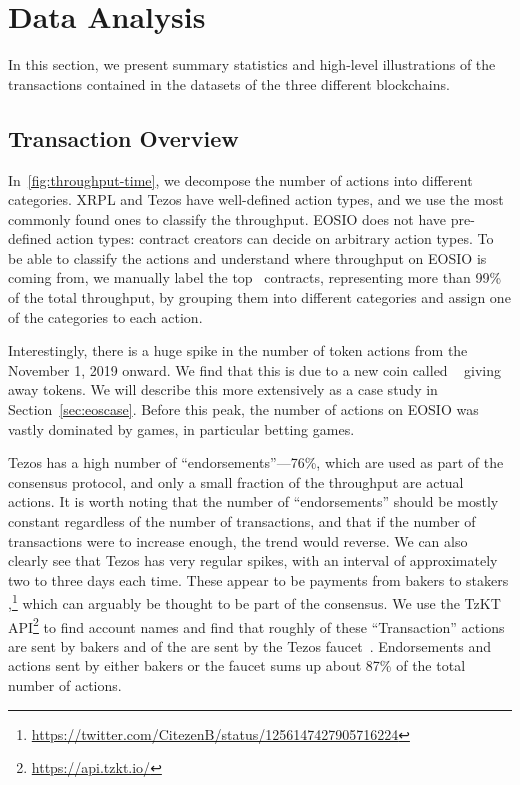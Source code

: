 \section{Data Analysis}
\label{sec:data-analysis}
In this section, we present summary statistics and high-level illustrations of the transactions contained in the datasets of the three different blockchains.

\subsection{Transaction Overview}


In~\autoref{fig:throughput-time}, we decompose the number of actions into different categories. XRPL and Tezos have well-defined action types, and we use the most commonly found ones to classify the throughput.
EOSIO does not have pre-defined action types: contract creators can decide on arbitrary action types.
To be able to classify the actions and understand where throughput on EOSIO is coming from, we manually label the top~ contracts, representing more than 99\% of the total throughput, by grouping them into different categories and assign one of the categories to each action.

Interestingly, there is a huge spike in the number of token actions from the November 1, 2019 onward. 
We find that this is due to a new coin called ~\cite{Enumivo2019} giving away tokens. 
We will describe this more extensively as a case study in Section~\ref{sec:eoscase}. 
Before this peak, the number of actions on EOSIO was vastly dominated by games, in particular betting games.

Tezos has a high number of ``endorsements''---76\%, which are used as part of the consensus protocol, and only a small fraction of the throughput are actual actions.
It is worth noting that the number of ``endorsements'' should be mostly constant regardless of the number of transactions, and that if the number of transactions were to increase enough, the trend would reverse.
We can also clearly see that Tezos has very regular spikes, with an interval of approximately two to three days each time.
These appear to be payments from bakers to stakers \cite{cryptium-labs-payout},\footnote{\url{https://twitter.com/CitezenB/status/1256147427905716224}} which can arguably be thought to be part of the consensus.
We use the TzKT API\footnote{\url{https://api.tzkt.io/}} to find account names and find that roughly  of these ``Transaction'' actions are sent by bakers and  of the are sent by the Tezos faucet~\cite{tezos-faucet}.
Endorsements and actions sent by either bakers or the faucet sums up about 87\% of the total number of actions.

